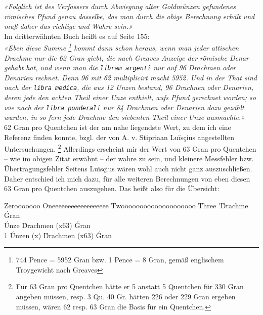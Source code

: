 \documentclass[a5paper,8pt]{scrbook}
\newcommand\ouncesofpound{12}
\newcommand\quentinsofounce{8}
\newcommand\gransofquentins{63}
\begin{document}
\emph{«Folglich ist des Verfassers durch Abwiegung
alter Goldmünzen gefundenes römisches Pfund genau dasselbe,
das man durch die obige Berechnung erhält
und muß daher das richtige und Wahre sein.»}\\

Im dritterwähnten Buch heißt es auf Seite 155:\\

\emph{«Eben diese Summe%
\footnote{744 Pence = 5952 Gran bzw. 1 Pence = 8 Gran,
gemäß englischem Troygewicht nach Greaves}
kommt dann schon heraus,
wenn man jeder attischen Drachme nur die 62 Gran giebt,
die nach Greaves Anzeige der römische Denar gehabt hat,
und wenn man die \texttt{libram argenti} nur auf 96 Drachmen
oder Denarien rechnet.
Denn 96 mit 62 multiplicirt macht 5952.
Und in der That sind nach der \texttt{libra medica},
die aus 12 Unzen bestand, 96 Drachnen oder Denarien,
deren jede den achten Theil einer Unze enthielt,
aufs Pfund gerechnet worden;
so wie nach der \texttt{libra ponderali} nur 84 Drachmen
oder Denarien dazu gezählt wurden,
in so fern jede Drachme den siebenten Theil einer Unze ausmachte.»}\\

62 Gran pro Quentchen
ist der am nahe liegendste Wert,
zu dem ich eine Referenz finden konnte,
bzgl. der von A. v. Stipriaan Luïsçius angestellten Untersuchungen.%
\footnote{Für 63 Gran pro Quentchen
hätte er 5 anstatt 5 Quentchen
für 330 Gran angeben müssen, resp. 3 Qu. 40 Gr. hätten 226 oder 229 Gran ergeben müssen, wären 62 resp. 63 Gran die Basis für ein Quentchen.}
Allerdings erscheint mir der Wert von 63 Gran pro Quentchen -- wie im obigen Zitat erwähnt -- der wahre zu sein, und kleinere Messfehler bzw. Übertragungsfehler Seitens Luïsçius wären wohl auch nicht ganz auszuschließen. Daher entschied ich mich dazu, für alle weiteren Berechnungen von eben diesen 63 Gran pro Quentchen auszugehen. Das heißt also für die Übersicht:\\

\noindent
\begin{minipage}{\linewidth}
\begin{tabbing}
Zerooooooo \= Oneeeeeeeeeeeeeeeeee \= Twoooooooooooooooooooo \= Three      \kill
           \>  \'                  \'Drachme             \>  \gransofquentins\'Gran \\
           \'Unze              \> \quentinsofounce\'Drachmen (x\gransofquentins)      \> \fpeval{\quentinsofounce * \gransofquentins}\'Gran \\
1 \Pfund   \>\ouncesofpound\'Unzen (x\fpeval{\quentinsofounce * \gransofquentins})      \>\fpeval{\ouncesofpound * \quentinsofounce}\'Drachmen (x\gransofquentins)      \>\fpeval{\ouncesofpound * \quentinsofounce * \gransofquentins}\'Gran \\
\end{tabbing}
\end{minipage}
\end{document}
